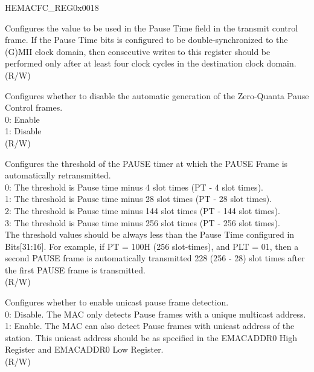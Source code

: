 \begin{register}{H}{EMACFC\_REG}{0x0018}\label{regdesc:EMACFLOWCONTROLREG}
%
%
%
%
%
%
%
%
%
\regnewline%
\begin{regdesc}\begin{reglist}
\item [PAUSE\_TIME] Configures the value to be used in the Pause Time field in the transmit control frame. If the Pause Time bits is configured to be double-synchronized to the (G)MII clock domain, then consecutive writes to this register should be performed only after at least four clock cycles in the destination clock domain. (R/W)
\item [DZPQ] Configures whether to disable the automatic generation of the Zero-Quanta Pause Control frames.\\
0: Enable\\
1: Disable\\(R/W)
\item [PLT] Configures the threshold of the PAUSE timer at which the PAUSE Frame is automatically retransmitted.\\
0: The threshold is Pause time minus 4 slot times (PT - 4 slot times).\\
1: The threshold is Pause time minus 28 slot times (PT - 28 slot times).\\
2: The threshold is Pause time minus 144 slot times (PT - 144 slot times).\\
3: The threshold is Pause time minus 256 slot times (PT - 256 slot times).\\
The threshold values should be always less than the Pause Time configured in Bits[31:16]. For example, if PT = 100H (256 slot-times), and PLT = 01, then a second PAUSE frame is automatically transmitted 228 (256 - 28) slot times after the first PAUSE frame is transmitted.\\ (R/W)
\item [UPFD] Configures whether to enable unicast pause frame detection.\\
0: Disable. The MAC only detects Pause frames with a unique multicast address.\\
1: Enable. The MAC can also detect Pause frames with unicast address of the station. This unicast address should be as specified in the EMACADDR0 High Register and EMACADDR0 Low Register.\\(R/W)

\end{reglist}
\end{regdesc}
\end{register}
